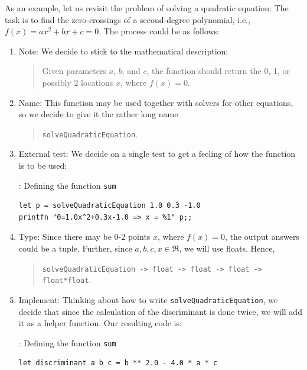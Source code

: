 \documentclass[fsharpNotes.tex]{subfiles}
\begin{document}
As an example, let us revisit the problem of solving a quadratic equation: The task is to find the zero-crossings of a second-degree polynomial, i.e., $f(x)=ax^2+bx+c=0$. The process could be as follows:
\begin{enumerate}
\item Note: We decide to stick to the mathematical description:
  \begin{quote}
    Given parameters $a$, $b$, and $c$, the function should return the 0, 1, or possibly 2 locations $x$, where $f(x)=0$.
  \end{quote}
\item Name: This function may be used together with solvers for other equations, so we decide to give it the rather long name
  \begin{quote}
    \lstinline{solveQuadraticEquation}.
  \end{quote}
\item External test: We decide on a single test to get a feeling of how the function is to be used:
\begin{codeNOutput}[label=solveQuadraticEquationTest,
  top=-5pt,
  bottom=-5pt,
  left=-2pt,
  right=-2pt,
]{: Defining the function \lstinline{sum}}
\begin{lstlisting}
let p = solveQuadraticEquation 1.0 0.3 -1.0
printfn "0=1.0x^2+0.3x-1.0 => x = %1" p;;
\end{lstlisting} 
\end{codeNOutput}
\item Type: Since there may be 0-2 points $x$, where $f(x)=0$, the output answers could be a tuple. Further, since $a,b,c,x\in\Re$, we will use floats. Hence,
  \begin{quote}
    \lstinline{solveQuadraticEquation -> float -> float -> float -> float*float}.
  \end{quote}
\item Implement: Thinking about how to write  \lstinline{solveQuadraticEquation}, we decide that since the calculation of the discriminant is done twice, we will add it as a helper function. Our resulting code is:
\begin{codeNOutput}[label=solveQuadraticEquationImplementation,
  top=-5pt,
  bottom=-5pt,
  left=-2pt,
  right=-2pt,
]{: Defining the function \lstinline{sum}}
\begin{lstlisting}
let discriminant a b c = b ** 2.0 - 4.0 * a * c


\end{lstlisting}
\end{codeNOutput}
\end{enumerate}
\end{document}
